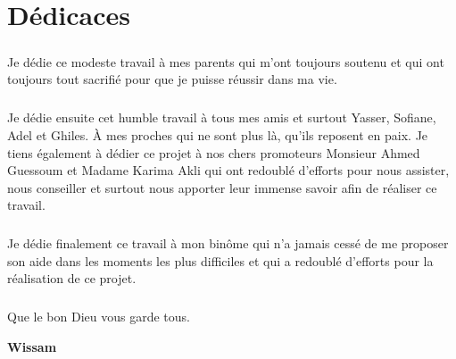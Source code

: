 \chapter*{Dédicaces}    

\vspace{1.5cm}

\paragraph{}
Je dédie ce modeste travail à mes parents qui m'ont toujours soutenu et qui ont toujours tout sacrifié pour que je puisse réussir dans ma vie.

\paragraph{}
Je dédie ensuite cet humble travail à tous mes amis et surtout Yasser, Sofiane, Adel et Ghiles. À mes proches qui ne sont plus là, qu'ils reposent en paix. Je tiens également à dédier ce projet à nos chers promoteurs Monsieur Ahmed Guessoum et Madame Karima Akli qui ont redoublé d'efforts pour nous assister, nous conseiller et surtout nous apporter leur immense savoir afin de réaliser ce travail.

\paragraph{}
Je dédie finalement ce travail à mon binôme qui n'a jamais cessé de me proposer son aide dans les moments les plus difficiles et qui a redoublé d'efforts pour la réalisation de ce projet.
\paragraph{}
Que le bon Dieu vous garde tous.

\vspace{0.5cm}
\begin{center}
	\Large
	\hspace{12.5cm}
	\textbf{Wissam}
\end{center}